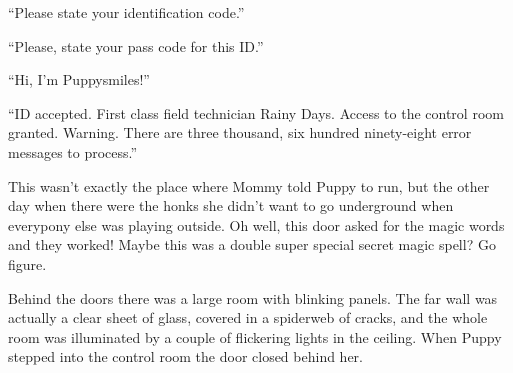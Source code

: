 






{\mt ``Please state your identification code.''}




{\mt ``Please, state your pass code for this ID.''}


``Hi, I'm Puppysmiles!''

{\mt ``ID accepted. First class field technician Rainy Days. Access to the control room granted. Warning. There are three thousand, six hundred ninety-eight error messages to process.''}




This wasn't exactly the place where Mommy told Puppy to run, but the other day when there were the honks she didn't want to go underground when everypony else was playing outside. Oh well, this door asked for the magic words and they worked! Maybe this was a double super special secret magic spell? Go figure.

Behind the doors there was a large room with blinking panels. The far wall was actually a clear sheet of glass, covered in a spiderweb of cracks, and the whole room was illuminated by a couple of flickering lights in the ceiling. When Puppy stepped into the control room the door closed behind her.

